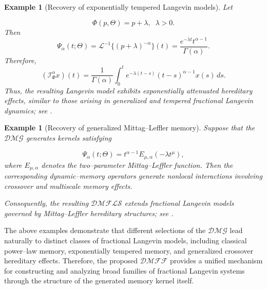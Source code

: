 \documentclass[11pt]{article}
\numberwithin{equation}{section}
\newtheorem{example}[definition]{Example}
\begin{document}

\begin{example}[Recovery of exponentially tempered Langevin models]

Let

\[
\Phi(p,\Theta)
=
p+\lambda,
\;\;
\lambda>0.
\]
Then
\[
\Psi_\alpha(t;\Theta)
=
\mathcal L^{-1}
\{
(p+\lambda)^{-\alpha}
\}(t)
=
\frac{
e^{-\lambda t}
t^{\alpha-1}
}{
\Gamma(\alpha)
}.
\]
Therefore,
\[
(\mathcal I_\Phi^\alpha x)(t)
=
\frac1{\Gamma(\alpha)}
\int_0^t
e^{-\lambda(t-s)}
(t-s)^{\alpha-1}
x(s)\,ds.
\]
Thus, the resulting Langevin model exhibits exponentially attenuated hereditary effects, similar to those arising in generalized and tempered fractional Langevin dynamics; see \cite{Deng2009}.

\end{example}


\begin{example}[Recovery of generalized Mittag--Leffler memory]

Suppose that the $\mathcal{DMG}$ generates kernels satisfying

\[
\Psi_\alpha(t;\Theta)
=
t^{\alpha-1}
E_{\mu,\alpha}
(-\lambda t^\mu),
\]
where
\(
E_{\mu,\alpha}
\)
denotes the two--parameter Mittag--Leffler function.
Then the corresponding dynamic--memory operators generate
nonlocal interactions involving crossover and multiscale
memory effects.

Consequently, the resulting $\mathcal{DMFLS}$
extends fractional Langevin models governed by Mittag--Leffler hereditary structures; see \cite{Wang2018}.

\end{example}


The above examples demonstrate that different selections of the   $\mathcal{DMG}$ lead naturally to distinct classes of fractional Langevin models,
including classical power--law memory, exponentially tempered memory,
and generalized crossover hereditary effects. Therefore, the proposed
$\mathcal{DMFF}$ provides a unified mechanism for constructing and analyzing broad
families of fractional Langevin systems through the structure of the
generated memory kernel itself.

\end{document}
